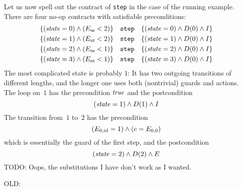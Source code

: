 \documentclass{article} %
\begin{document}
Let us now spell out the contract of {\tt step} in the case of the running example.
There are four no-op contracts with satisfiable preconditions:
\begin{align*}
\{({\it state}=0)\land(E_{\rm sz}<2)\} \quad\text{\tt step}\quad
  \{({\it state}=0)\land D(0)\land I\} \\
\{({\it state}=1)\land(E_{\rm sz}<2)\} \quad\text{\tt step}\quad
  \{({\it state}=1)\land D(0)\land I\} \\
\{({\it state}=2)\land(E_{\rm sz}<1)\} \quad\text{\tt step}\quad
  \{({\it state}=2)\land D(0)\land I\} \\
\{({\it state}=3)\land(E_{\rm sz}<1)\} \quad\text{\tt step}\quad
  \{({\it state}=3)\land D(0)\land I\}
\end{align*}
The most complicated state is probably $1$:
It has two outgoing transitions of different lengths, and the longer one uses both (nontrivial) guards and actions.
The loop on~$1$ has the precondition ${\it true}$ and the postcondition
\[ ({\it state}=1) \land D(1) \land I \]
The transition from~$1$ to~$2$ has the precondition
\[ (E_{0,{\rm id}}=1)\land(c=E_{0,0}) \]
which is essentially the guard of the first step, and the postcondition
\[ ({\it state}=2)\land D(2)\land E\]
TODO: Oops, the substitutions I have don't work as I wanted.



OLD:
\end{document}
